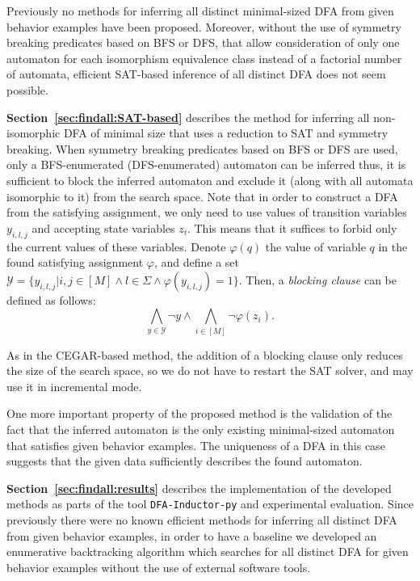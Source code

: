 Previously no methods for inferring all distinct minimal-sized DFA from given behavior examples have been proposed.
Moreover, without the use of symmetry breaking predicates based on BFS or DFS, that allow consideration of only one automaton for each isomorphism equivalence class instead of a factorial number of automata, efficient SAT-based inference of all distinct DFA does not seem possible.

\textbf{Section~\ref{sec:findall:SAT-based}} describes the method for inferring all non-isomorphic DFA of minimal size that uses a reduction to SAT and symmetry breaking.
When symmetry breaking predicates based on BFS or DFS are used, only a BFS-enumerated (DFS-enumerated) automaton can be inferred thus, it is sufficient to block the inferred automaton and
exclude it (along with all automata isomorphic to it) from the search space.
Note that in order to construct a DFA from the satisfying assignment, we only need to use values of transition variables $y_{i,l,j}$ and accepting state variables $z_{i}$.
This means that it suffices to forbid only the current values of these variables.
Denote $\varphi\left(q\right)$ the value of variable $q$ in the found satisfying assignment $\varphi$, and define a set $\mathcal{Y} = \{y_{i,l,j} | i,j \in \left[M\right] \wedge l \in \Sigma \wedge \varphi\left(y_{i,l,j}\right) = 1\}$.
Then, a \emph{blocking clause} can be defined as follows:
\begin{equation*}
\bigwedge_{y \in \mathcal{Y}} \neg y \wedge \bigwedge_{i \in \left[M\right]}\neg \varphi\left(z_{i}\right).
\end{equation*}

As in the CEGAR-based method, the addition of a blocking clause only reduces the size of the search space, so we do not have to restart the SAT solver, and may use it in 
incremental mode.

One more important property of the proposed method is the validation of the fact that the inferred automaton is the only existing minimal-sized automaton that satisfies given
behavior examples.
The uniqueness of a DFA in this case suggests that the given data sufficiently describes the found automaton.

\textbf{Section~\ref{sec:findall:results}} describes the implementation of the developed methods as parts of the tool \texttt{DFA-Inductor-py} and experimental evaluation.
Since previously there were no known efficient methods for inferring all distinct DFA from given behavior examples, in order to have a baseline we developed an enumerative backtracking algorithm which searches for all distinct DFA for given behavior examples without the use of external software tools.

